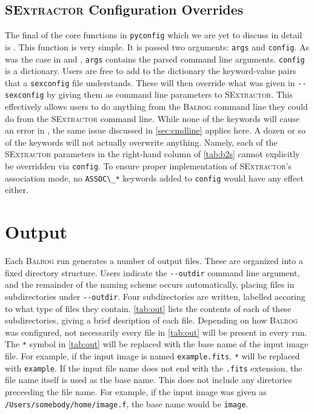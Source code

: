 \documentclass[12pt]{book}
\newcommand{\codett}[1]{\lstinline{#1}}
\newcommand{\pyconfig}{\codett{pyconfig}}
\newcommand{\balrog}{\textsc{Balrog}}
\newcommand{\sex}{\textsc{SExtractor}}
\newcommand{\opt}[1]{\codett{--#1}}
\begin{document}
\section{\sex{} Configuration Overrides}
\label{sec:sexoverride}

The final of the core functions in \pyconfig{} which we are yet to discuss in detail is \sexfunc{}.
This function is very simple. It is passed two arguments: \codett{args} and \codett{config}.
As was the case in \simfunc{} and \gspfunc{}, \codett{args} contains the parsed command line arguments.
\codett{config} is a dictionary. Users are free to add to the dictionary the keyword-value pairs
that a \codett{sexconfig} file understands. These will then override what was given in \opt{sexconfig}
by giving them as command line parameters to \sex{}.
This effectively allows users to do anything from the \balrog{} command line they could do from the \sex{} command line.
While none of the keywords will cause an error in \sexfunc{}, 
the same issue discussed in \autoref{sec:cmdline} applies here.
A dozen or so of the keywords will not actually overwrite anything.
Namely, each of the \sex{} parameters in the right-hand column of \autoref{tab:b2s} cannot explicitly be overridden via \codett{config}.
To ensure proper implementation of \sex{}'s association mode, no \codett{ASSOC\_*} keywords added to \codett{config}
would have any effect either.


\chapter{Output}
\label{sec:out}
Each \balrog{} run generates a number of output files. 
These are organized into a fixed directory structure.
Users indicate the \opt{outdir} command line argument, and
the remainder of the naming scheme occurs automatically,
placing files in subdirectories under \opt{outdir}.
Four subdirectories are written, labelled accoring to what
type of files they contain. \autoref{tab:out}
lists the contents of each of these subdirectories,
giving a brief desription of each file. Depending on how
\balrog{} was configured, not necessarily every file
in \autoref{tab:out} will be present in every run.
The \codett{*} symbol in \autoref{tab:out} will be replaced with
the base name of the input image file. For example,
if the input image is named \codett{example.fits},
\codett{*} will be replaced with \codett{example}.
If the input file name does not end with the \codett{.fits}
extension, the file name itself is used as the base name.
This does not include any diretories preceeding the file name.
For example, if the input image was given as
\codett{/Users/somebody/home/image.f}, the
base name would be \codett{image}.
\end{document}

